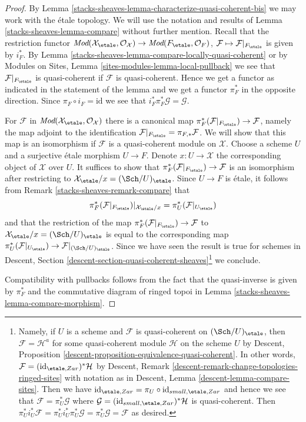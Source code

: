 \begin{proof}
By Lemma \ref{stacks-sheaves-lemma-characterize-quasi-coherent-bis} we may work with
the \'etale topology. We will use the notation and results of
Lemma \ref{stacks-sheaves-lemma-compare} without further mention.
Recall that the restriction functor
$\textit{Mod}(\mathcal{X}_\etale, \mathcal{O}_\mathcal{X}) \to
\textit{Mod}(F_\etale, \mathcal{O}_F)$,
$\mathcal{F} \mapsto \mathcal{F}|_{F_\etale}$ is given by $i_F^*$. By
Lemma \ref{stacks-sheaves-lemma-compare-locally-quasi-coherent} or by
Modules on Sites, Lemma \ref{sites-modules-lemma-local-pullback}
we see that $\mathcal{F}|_{F_\etale}$ is quasi-coherent if
$\mathcal{F}$ is quasi-coherent.
Hence we get a functor as indicated in the statement of the
lemma and we get a functor $\pi_F^*$ in the opposite direction.
Since $\pi_F \circ i_F = \text{id}$ we see that
$i_F^*\pi_F^*\mathcal{G} = \mathcal{G}$.

\medskip\noindent
For $\mathcal{F}$ in
$\textit{Mod}(\mathcal{X}_\etale, \mathcal{O}_\mathcal{X})$
there is a canonical map $\pi_F^*(\mathcal{F}|_{F_\etale}) \to \mathcal{F}$,
namely the map adjoint to the identification
$\mathcal{F}|_{F_\etale} = \pi_{F, *}\mathcal{F}$.
We will show that this map is an isomorphism if $\mathcal{F}$ is
a quasi-coherent module on $\mathcal{X}$.
Choose a scheme $U$ and a surjective \'etale morphism $U \to F$.
Denote $x : U \to \mathcal{X}$ the corresponding object of $\mathcal{X}$
over $U$. It suffices to show that
$\pi_F^*(\mathcal{F}|_{F_\etale}) \to \mathcal{F}$ is an isomorphism
after restricting to $\mathcal{X}_\etale/x = (\Sch/U)_\etale$.
Since $U \to F$ is \'etale, it follows from Remark \ref{stacks-sheaves-remark-compare} that
$$
\pi_F^*(\mathcal{F}|_{F_\etale})|_{\mathcal{X}_\etale/x} =
\pi_U^*(\mathcal{F}|_{U_\etale})
$$
and that the restriction of the map
$\pi_F^*(\mathcal{F}|_{F_\etale}) \to \mathcal{F}$
to $\mathcal{X}_\etale/x = (\Sch/U)_\etale$
is equal to the corresponding map
$\pi_U^*(\mathcal{F}|_{U_\etale}) \to \mathcal{F}|_{(\Sch/U)_\etale}$.
Since we have seen the result is true for schemes in
Descent, Section \ref{descent-section-quasi-coherent-sheaves}\footnote{Namely,
if $U$ is a scheme and $\mathcal{F}$ is quasi-coherent on
$(\Sch/U)_\etale$, then $\mathcal{F} = \mathcal{H}^a$ for some
quasi-coherent module $\mathcal{H}$ on the scheme $U$ by
Descent, Proposition \ref{descent-proposition-equivalence-quasi-coherent}.
In other words, $\mathcal{F} = (\text{id}_{\etale,Zar})^*\mathcal{H}$
by Descent, Remark \ref{descent-remark-change-topologies-ringed-sites}
with notation as in Descent, Lemma \ref{descent-lemma-compare-sites}.
Then we have
$\text{id}_{\etale,Zar} = \pi_U \circ \text{id}_{small,\etale,Zar}$
and hence we see that $\mathcal{F} = \pi_U^*\mathcal{G}$ where
$\mathcal{G} = (\text{id}_{small,\etale,Zar})^*\mathcal{H}$ is
quasi-coherent. Then
$\pi_U^*i_U^*\mathcal{F} = \pi_U^*i_U^*\pi_U^*\mathcal{G} =
\pi_U^*\mathcal{G} = \mathcal{F}$ as desired.}
we conclude.

\medskip\noindent
Compatibility with pullbacks follows from the fact that
the quasi-inverse is given by $\pi_F^*$ and the
commutative diagram of ringed topoi in
Lemma \ref{stacks-sheaves-lemma-compare-morphism}.
\end{proof}

